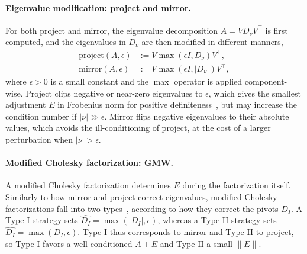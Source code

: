 \documentclass[class=scrbook, crop=false]{standalone}
\begin{document}
\paragraph{Eigenvalue modification: project and mirror.}
For both project and mirror, 
the eigenvalue decomposition $A = V D_\nu V^\top$ is first computed,
and the eigenvalues in $D_\nu$ are then modified in different manners,
\begin{align*}
    \mathrm{project}(A, \epsilon) &:= V \max(\epsilon I, D_\nu) V^\top, \\
    \mathrm{mirror}(A, \epsilon) &:= V \max(\epsilon I, \lvert D_\nu\rvert) V^\top,
\end{align*}
where $\epsilon > 0$ is a small constant and the $\max$ operator is applied component-wise.
Project clips negative or near-zero eigenvalues to $\epsilon$,
which gives the smallest adjustment $E$ in Frobenius norm for positive definiteness~\cite{nocedal2006numerical},
but may increase the condition number if $\lvert\nu\rvert \gg \epsilon$.
Mirror flips negative eigenvalues to their absolute values,
which avoids the ill-conditioning of project, at the cost of a larger perturbation when $\lvert\nu\rvert > \epsilon$.

\paragraph{Modified Cholesky factorization: \gls{GMW}.}
A modified Cholesky factorization determines $E$ during the factorization itself.
Similarly to how mirror and project correct eigenvalues,
modified Cholesky factorizations fall into two types~\cite{fangModifiedCholeskyAlgorithms2007},
according to how they correct the pivots $D_I$.
A Type-I strategy sets $\hat{D_I} = \max(\lvert D_I\rvert, \epsilon)$,
whereas a Type-II strategy sets $\hat{D_I} = \max(D_I, \epsilon)$.
Type-I thus corresponds to mirror and Type-II to project,
so Type-I favors a well-conditioned $A+E$ and Type-II a small $\|E\|$.
\end{document}

